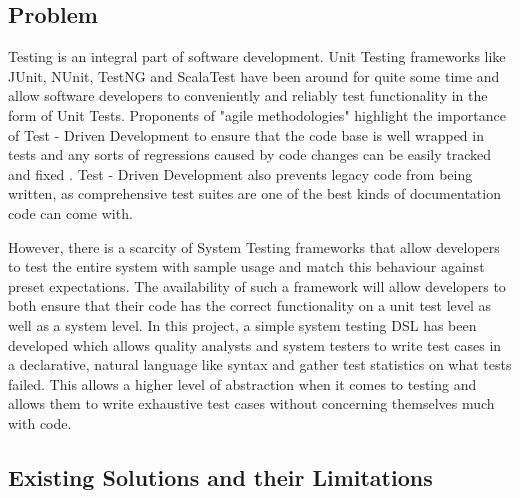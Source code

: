 \documentclass[12pt]{article}
\begin{document}
\subsection{Problem}
Testing is an integral part of software development. Unit Testing frameworks like JUnit, NUnit, TestNG and ScalaTest have been around for quite some time and allow software developers to conveniently and reliably test functionality in the form of Unit Tests. Proponents of "agile methodologies" highlight the importance of Test - Driven Development to ensure that the code base is well wrapped in tests and any sorts of regressions caused by code changes can be easily tracked and fixed \cite{tdd}. Test - Driven Development also prevents legacy code from being written, as comprehensive test suites are one of the best kinds of documentation code can come with.
\bigskip

\noindent
However, there is a scarcity of System Testing frameworks that allow developers to test the entire system with sample usage and match this behaviour against preset expectations. The availability of such a framework will allow developers to both ensure that their code has the correct functionality on a unit test level as well as a system level. In this project, a simple system testing DSL has been developed which allows quality analysts and system testers to write test cases in a declarative, natural language like syntax and gather test statistics on what tests failed. This allows a higher level of abstraction when it comes to testing and allows them to write exhaustive test cases without concerning themselves much with code.
\newpage

\subsection{Existing Solutions and their Limitations}
\end{document}
